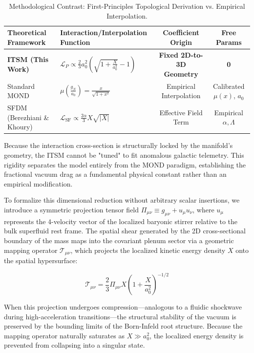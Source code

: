 \documentclass[aps,prd,10pt,twocolumn,superscriptaddress,nofootinbib,floatfix]{revtex4-2}
\begin{document}
\begin{table}[htbp]
\caption{\label{tab:mond_matrix}Methodological Contrast: First-Principles Topological Derivation vs. Empirical Interpolation.}
\begin{ruledtabular}
\begin{tabular}{llcc}
\textbf{Theoretical Framework} & \textbf{Interaction/Interpolation Function} & \textbf{Coefficient Origin} & \textbf{Free Params} \\
\hline
\textbf{ITSM (This Work)} & $\mathcal{L}_{P} \propto \frac{2}{3} a_0^2 \left(\sqrt{1+\frac{X}{a_0^2}}-1\right)$ & \textbf{Fixed 2D-to-3D Geometry} & \textbf{0} \\
Standard MOND & $\mu\left(\frac{g_N}{a_0}\right) = \frac{x}{\sqrt{1+x^2}}$ & Empirical Interpolation & Calibrated $\mu(x)$, $a_0$ \\
SFDM (Berezhiani \& Khoury) & $\mathcal{L}_{\text{SF}} \propto \frac{2\alpha}{3} X\sqrt{|X|}$ & Effective Field Term & Empirical $\alpha, \Lambda$ \\
\end{tabular}
\end{ruledtabular}
\end{table}

Because the interaction cross-section is structurally locked by the manifold's geometry, the ITSM cannot be "tuned" to fit anomalous galactic telemetry. This rigidity separates the model entirely from the MOND paradigm, establishing the fractional vacuum drag as a fundamental physical constant rather than an empirical modification.

To formalize this dimensional reduction without arbitrary scalar insertions, we introduce a symmetric projection tensor field $\Pi_{\mu\nu} \equiv g_{\mu\nu} + u_{\mu}u_{\nu}$, where $u_{\mu}$ represents the 4-velocity vector of the localized baryonic stirrer relative to the bulk superfluid rest frame. The spatial shear generated by the 2D cross-sectional boundary of the mass maps into the covariant plenum sector via a geometric mapping operator $\mathcal{T}_{\mu\nu}$, which projects the localized kinetic energy density $X$ onto the spatial hypersurface:

\begin{equation}
\mathcal{T}_{\mu\nu} = \frac{2}{3} \Pi_{\mu\nu} X \left( 1 + \frac{X}{a_0^2} \right)^{-1/2}
\end{equation}

When this projection undergoes compression—analogous to a fluidic shockwave during high-acceleration transitions—the structural stability of the vacuum is preserved by the bounding limits of the Born-Infeld root structure. Because the mapping operator naturally saturates as $X \gg a_0^2$, the localized energy density is prevented from collapsing into a singular state. 
\end{document}
